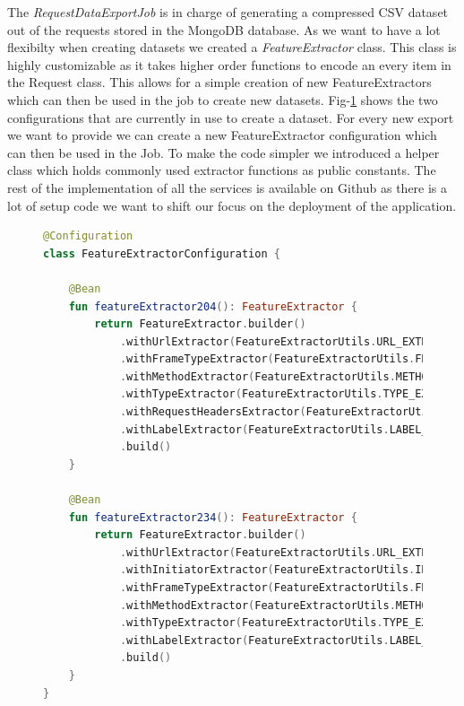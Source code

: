 The \emph{RequestDataExportJob} is in charge of generating a compressed CSV dataset out of the requests stored in the MongoDB database. As we want 
to have a lot flexibilty when creating datasets we created a \emph{FeatureExtractor} class. This class is highly customizable as it takes higher order functions
to encode an every item in the Request class. This allows for a simple creation of new FeatureExtractors which can then be used in the job to create new datasets.
Fig-\ref{fig:Feature} shows the two configurations that are currently in use to create a dataset. For every new export we want to provide we 
can create a new FeatureExtractor configuration which can then be used in the Job. To make the code simpler we introduced a helper class which 
holds commonly used extractor functions as public constants. The rest of the implementation of all the services is available on Github \cite{trackingDetectorInfra} as there is
a lot of setup code we want to shift our focus on the deployment of the application.
\begin{figure}[ht!]
\begin{lstlisting}[language=Kotlin]
@Configuration
class FeatureExtractorConfiguration {

    @Bean
    fun featureExtractor204(): FeatureExtractor {
        return FeatureExtractor.builder()
            .withUrlExtractor(FeatureExtractorUtils.URL_EXTRACTOR)
            .withFrameTypeExtractor(FeatureExtractorUtils.FRAME_TYPE_EXTRACTOR)
            .withMethodExtractor(FeatureExtractorUtils.METHOD_EXTRACTOR)
            .withTypeExtractor(FeatureExtractorUtils.TYPE_EXTRACTOR)
            .withRequestHeadersExtractor(FeatureExtractorUtils.REQUEST_HEADER_REFERER)
            .withLabelExtractor(FeatureExtractorUtils.LABEL_EXTRACTOR)
            .build()
    }

    @Bean
    fun featureExtractor234(): FeatureExtractor {
        return FeatureExtractor.builder()
            .withUrlExtractor(FeatureExtractorUtils.URL_EXTRACTOR)
            .withInitiatorExtractor(FeatureExtractorUtils.INITIATOR_EXTRACTOR)
            .withFrameTypeExtractor(FeatureExtractorUtils.FRAME_TYPE_EXTRACTOR)
            .withMethodExtractor(FeatureExtractorUtils.METHOD_EXTRACTOR)
            .withTypeExtractor(FeatureExtractorUtils.TYPE_EXTRACTOR)
            .withLabelExtractor(FeatureExtractorUtils.LABEL_EXTRACTOR)
            .build()
    }
}
\end{lstlisting}
\caption{}
\label{fig:Feature}
\end{figure}

